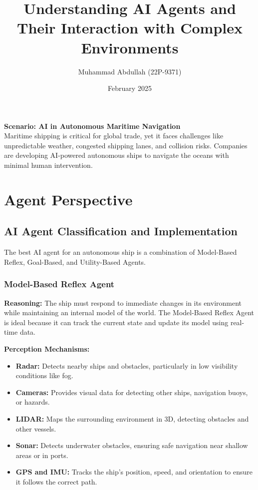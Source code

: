 \documentclass{article}
\title{Understanding AI Agents and Their Interaction with Complex Environments}
\author{Muhammad Abdullah (22P-9371)}
\date{February 2025}
\begin{document}
\maketitle

\textbf{\large Scenario: AI in Autonomous Maritime Navigation}\\
Maritime shipping is critical for global trade, yet it faces challenges like unpredictable weather, congested shipping lanes, and collision risks. Companies are developing AI-powered autonomous ships to navigate the oceans with minimal human intervention.

\section{Agent Perspective}
\subsection{AI Agent Classification and Implementation}
The best AI agent for an autonomous ship is a combination of Model-Based Reflex, Goal-Based, and Utility-Based Agents.

\subsubsection{Model-Based Reflex Agent}
\textbf{Reasoning:} The ship must respond to immediate changes in its environment while maintaining an internal model of the world. The Model-Based Reflex Agent is ideal because it can track the current state and update its model using real-time data.

\textbf{Perception Mechanisms:}
\begin{itemize}
    \item \textbf{Radar:} Detects nearby ships and obstacles, particularly in low visibility conditions like fog.
    \item \textbf{Cameras:} Provides visual data for detecting other ships, navigation buoys, or hazards.
    \item \textbf{LIDAR:} Maps the surrounding environment in 3D, detecting obstacles and other vessels.
    \item \textbf{Sonar:} Detects underwater obstacles, ensuring safe navigation near shallow areas or in ports.
    \item \textbf{GPS and IMU:} Tracks the ship's position, speed, and orientation to ensure it follows the correct path.
\end{itemize}
\end{document}
